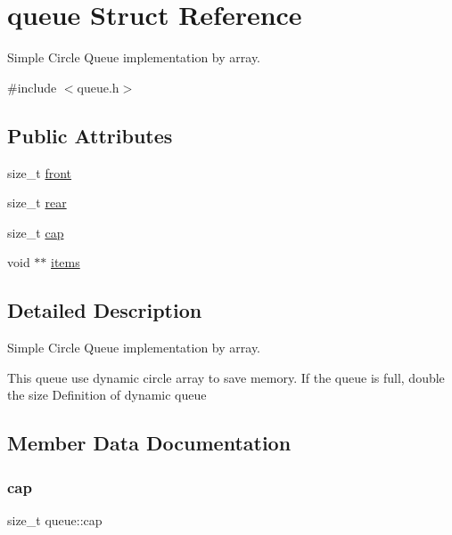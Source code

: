 \hypertarget{structqueue}{}\section{queue Struct Reference}
\label{structqueue}


Simple Circle Queue implementation by array.  




{\ttfamily \#include $<$queue.\+h$>$}

\subsection*{Public Attributes}
\begin{DoxyCompactItemize}
\item 
size\+\_\+t \mbox{\hyperlink{structqueue_a4fab87a90c34561a806c1837eb4774c6}{front}}
\item 
size\+\_\+t \mbox{\hyperlink{structqueue_a71eff21c56cc3644a766901cd21f773d}{rear}}
\item 
size\+\_\+t \mbox{\hyperlink{structqueue_ac87392c867b092d5cd96ed1b448f9eb3}{cap}}
\item 
void $\ast$$\ast$ \mbox{\hyperlink{structqueue_a4c90fc914a6825a61866f13ce4fdb225}{items}}
\end{DoxyCompactItemize}


\subsection{Detailed Description}
Simple Circle Queue implementation by array. 

This queue use dynamic circle array to save memory. If the queue is full, double the size Definition of dynamic queue 

\subsection{Member Data Documentation}
\mbox{\label{structqueue_ac87392c867b092d5cd96ed1b448f9eb3}} 
\subsubsection{\texorpdfstring{cap}{cap}}
{\footnotesize\ttfamily size\+\_\+t queue\+::cap}

\mbox{\label{structqueue_a4fab87a90c34561a806c1837eb4774c6}} 
